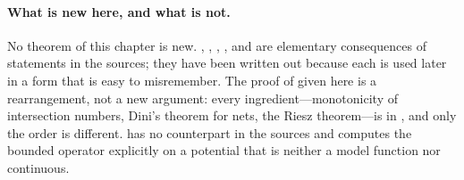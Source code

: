 \paragraph{What is new here, and what is not.}
No theorem of this chapter is new.  ,
, ,
,
 and
 are elementary consequences of
statements in the sources; they have been written out because each is used
later in a form that is easy to misremember.  The proof of
 given here is a rearrangement, not a new
argument: every ingredient---monotonicity of intersection numbers, Dini's
theorem for nets, the Riesz theorem---is in \cite{BFJ15}, and only the order
is different.   has no counterpart in the sources
and computes the bounded operator explicitly on a potential that is
neither a model function nor continuous.
